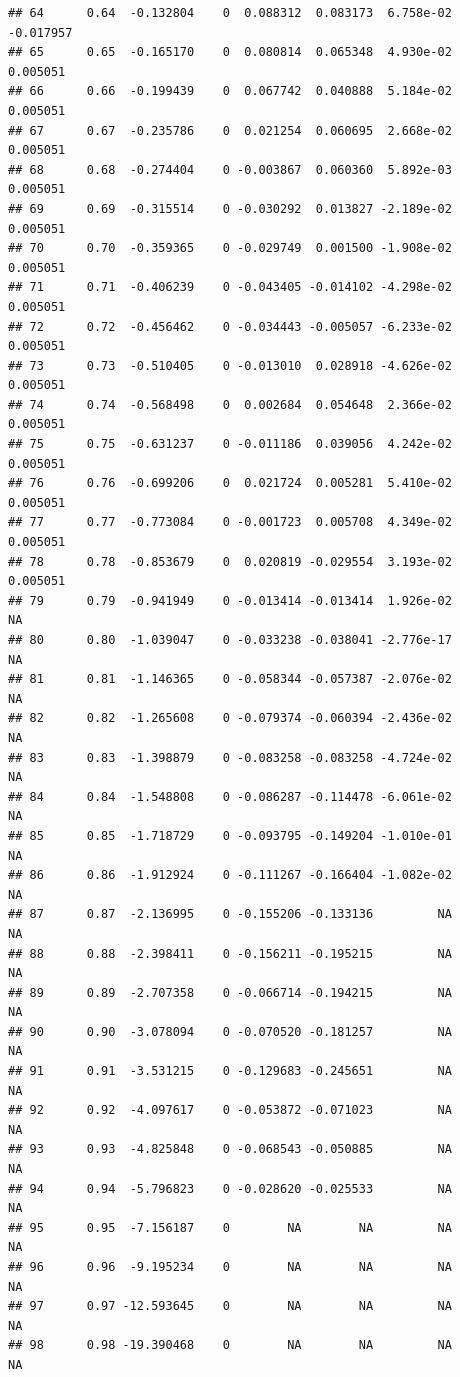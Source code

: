 \documentclass{article}\usepackage[]{graphicx}\usepackage[]{color}
\makeatletter
\newenvironment{kframe}{%
 \def\at@end@of@kframe{}%
 \ifinner\ifhmode%
  \def\at@end@of@kframe{\end{minipage}}%
  \begin{minipage}{\columnwidth}%
 \fi\fi%
 \def\FrameCommand##1{\hskip\@totalleftmargin \hskip-\fboxsep
 \colorbox{shadecolor}{##1}\hskip-\fboxsep
     \hskip-\linewidth \hskip-\@totalleftmargin \hskip\columnwidth}%
 \MakeFramed {\advance\hsize-\width
   \@totalleftmargin\z@ \linewidth\hsize
   \@setminipage}}%
 {\par\unskip\endMakeFramed%
 \at@end@of@kframe}
\newenvironment{knitrout}{}{} %
\makeatother
\begin{document}
\begin{knitrout}
\begin{kframe}
\begin{verbatim}
## 64      0.64  -0.132804    0  0.088312  0.083173  6.758e-02   -0.017957
## 65      0.65  -0.165170    0  0.080814  0.065348  4.930e-02    0.005051
## 66      0.66  -0.199439    0  0.067742  0.040888  5.184e-02    0.005051
## 67      0.67  -0.235786    0  0.021254  0.060695  2.668e-02    0.005051
## 68      0.68  -0.274404    0 -0.003867  0.060360  5.892e-03    0.005051
## 69      0.69  -0.315514    0 -0.030292  0.013827 -2.189e-02    0.005051
## 70      0.70  -0.359365    0 -0.029749  0.001500 -1.908e-02    0.005051
## 71      0.71  -0.406239    0 -0.043405 -0.014102 -4.298e-02    0.005051
## 72      0.72  -0.456462    0 -0.034443 -0.005057 -6.233e-02    0.005051
## 73      0.73  -0.510405    0 -0.013010  0.028918 -4.626e-02    0.005051
## 74      0.74  -0.568498    0  0.002684  0.054648  2.366e-02    0.005051
## 75      0.75  -0.631237    0 -0.011186  0.039056  4.242e-02    0.005051
## 76      0.76  -0.699206    0  0.021724  0.005281  5.410e-02    0.005051
## 77      0.77  -0.773084    0 -0.001723  0.005708  4.349e-02    0.005051
## 78      0.78  -0.853679    0  0.020819 -0.029554  3.193e-02    0.005051
## 79      0.79  -0.941949    0 -0.013414 -0.013414  1.926e-02          NA
## 80      0.80  -1.039047    0 -0.033238 -0.038041 -2.776e-17          NA
## 81      0.81  -1.146365    0 -0.058344 -0.057387 -2.076e-02          NA
## 82      0.82  -1.265608    0 -0.079374 -0.060394 -2.436e-02          NA
## 83      0.83  -1.398879    0 -0.083258 -0.083258 -4.724e-02          NA
## 84      0.84  -1.548808    0 -0.086287 -0.114478 -6.061e-02          NA
## 85      0.85  -1.718729    0 -0.093795 -0.149204 -1.010e-01          NA
## 86      0.86  -1.912924    0 -0.111267 -0.166404 -1.082e-02          NA
## 87      0.87  -2.136995    0 -0.155206 -0.133136         NA          NA
## 88      0.88  -2.398411    0 -0.156211 -0.195215         NA          NA
## 89      0.89  -2.707358    0 -0.066714 -0.194215         NA          NA
## 90      0.90  -3.078094    0 -0.070520 -0.181257         NA          NA
## 91      0.91  -3.531215    0 -0.129683 -0.245651         NA          NA
## 92      0.92  -4.097617    0 -0.053872 -0.071023         NA          NA
## 93      0.93  -4.825848    0 -0.068543 -0.050885         NA          NA
## 94      0.94  -5.796823    0 -0.028620 -0.025533         NA          NA
## 95      0.95  -7.156187    0        NA        NA         NA          NA
## 96      0.96  -9.195234    0        NA        NA         NA          NA
## 97      0.97 -12.593645    0        NA        NA         NA          NA
## 98      0.98 -19.390468    0        NA        NA         NA          NA

\end{verbatim}
\end{kframe}
\end{knitrout}
\end{document}
